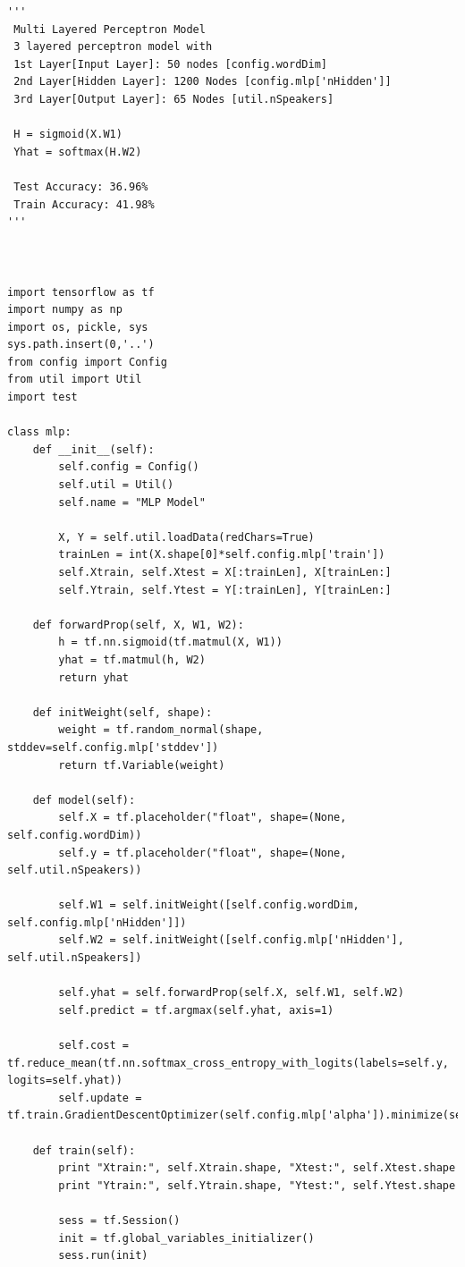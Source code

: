 \documentclass[BTech]{srmuthesis}
\begin{document}
\begin{verbatim}
'''
 Multi Layered Perceptron Model
 3 layered perceptron model with
 1st Layer[Input Layer]: 50 nodes [config.wordDim]
 2nd Layer[Hidden Layer]: 1200 Nodes [config.mlp['nHidden']]
 3rd Layer[Output Layer]: 65 Nodes [util.nSpeakers]

 H = sigmoid(X.W1)
 Yhat = softmax(H.W2)

 Test Accuracy: 36.96%
 Train Accuracy: 41.98%
'''



import tensorflow as tf
import numpy as np
import os, pickle, sys
sys.path.insert(0,'..')
from config import Config
from util import Util
import test

class mlp:
    def __init__(self):
        self.config = Config()
        self.util = Util()
        self.name = "MLP Model"

        X, Y = self.util.loadData(redChars=True)
        trainLen = int(X.shape[0]*self.config.mlp['train'])
        self.Xtrain, self.Xtest = X[:trainLen], X[trainLen:]
        self.Ytrain, self.Ytest = Y[:trainLen], Y[trainLen:]

    def forwardProp(self, X, W1, W2):
        h = tf.nn.sigmoid(tf.matmul(X, W1))
        yhat = tf.matmul(h, W2)
        return yhat

    def initWeight(self, shape):
        weight = tf.random_normal(shape, stddev=self.config.mlp['stddev'])
        return tf.Variable(weight)

    def model(self):
        self.X = tf.placeholder("float", shape=(None, self.config.wordDim))
        self.y = tf.placeholder("float", shape=(None, self.util.nSpeakers))

        self.W1 = self.initWeight([self.config.wordDim, self.config.mlp['nHidden']])
        self.W2 = self.initWeight([self.config.mlp['nHidden'], self.util.nSpeakers])

        self.yhat = self.forwardProp(self.X, self.W1, self.W2)
        self.predict = tf.argmax(self.yhat, axis=1)

        self.cost = tf.reduce_mean(tf.nn.softmax_cross_entropy_with_logits(labels=self.y, logits=self.yhat))
        self.update = tf.train.GradientDescentOptimizer(self.config.mlp['alpha']).minimize(self.cost)

    def train(self):
        print "Xtrain:", self.Xtrain.shape, "Xtest:", self.Xtest.shape
        print "Ytrain:", self.Ytrain.shape, "Ytest:", self.Ytest.shape

        sess = tf.Session()
        init = tf.global_variables_initializer()
        sess.run(init)


\end{verbatim}
\end{document}
